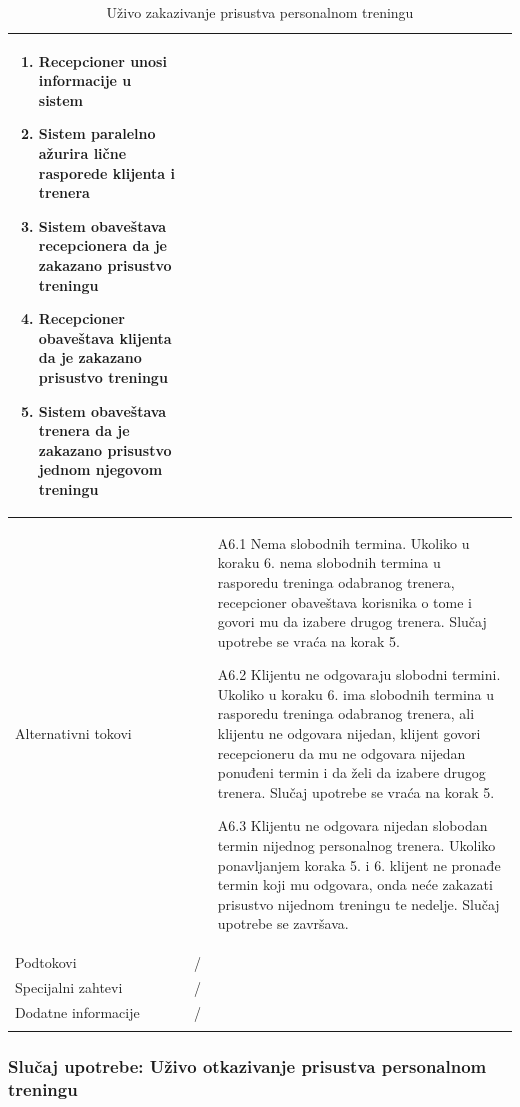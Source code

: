 \begin{longtable}{| p{} | p{} |}
\begin{enumerate}
    \item Recepcioner unosi informacije u sistem
    \item Sistem paralelno ažurira lične rasporede klijenta i trenera
    \item Sistem obaveštava recepcionera da je zakazano prisustvo treningu
    \item Recepcioner obaveštava klijenta da je zakazano prisustvo treningu
    \item Sistem obaveštava trenera da je zakazano prisustvo jednom njegovom treningu
   \end{enumerate}\\
\hline
    Alternativni tokovi & 
    \begin{itemize}
    \item[A6.1] Nema slobodnih termina. Ukoliko u koraku 6. nema slobodnih termina u rasporedu treninga odabranog trenera, recepcioner obaveštava korisnika o tome i govori mu da izabere drugog trenera. Slučaj upotrebe se vraća na korak 5.
    \item[A6.2] Klijentu ne odgovaraju slobodni termini. Ukoliko u koraku 6. ima slobodnih termina u rasporedu treninga odabranog trenera, ali klijentu ne odgovara nijedan, klijent govori recepcioneru da mu ne odgovara nijedan ponuđeni termin i da želi da izabere drugog trenera. Slučaj upotrebe se vraća na korak 5.
    \item[A6.3] Klijentu ne odgovara nijedan slobodan termin nijednog personalnog trenera. Ukoliko ponavljanjem koraka 5. i 6. klijent ne pronađe termin koji mu odgovara, onda neće zakazati prisustvo nijednom treningu te nedelje. Slučaj upotrebe se završava.
   \end{itemize}\\
\hline
    Podtokovi & /\\
\hline
    Specijalni zahtevi & /\\
\hline
    Dodatne informacije & /\\
\hline
\caption{Uživo zakazivanje prisustva personalnom treningu}
\end{longtable}


    
   



\subsubsection{Slučaj upotrebe: Uživo otkazivanje prisustva personalnom treningu}

